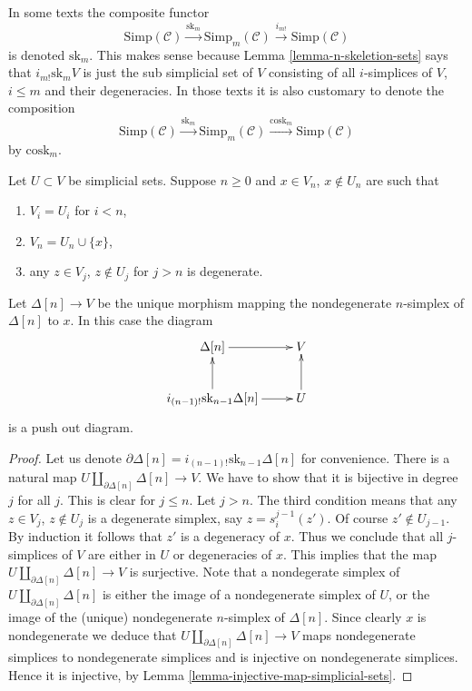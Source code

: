 \begin{remark}
\label{remark-sk-literature}
In some texts the composite functor
$$
\text{Simp}(\mathcal{C})
\xrightarrow{\text{sk}_m}
\text{Simp}_m(\mathcal{C})
\xrightarrow{i_{m!}}
\text{Simp}(\mathcal{C})
$$
is denoted $\text{sk}_m$. This makes sense because
Lemma \ref{lemma-n-skeletion-sets} says
that $i_{m!} \text{sk}_m V$ is just the sub simplicial set
of $V$ consisting of all $i$-simplices of $V$, $i \leq m$
and their degeneracies. In those texts it is also customary
to denote the composition
$$
\text{Simp}(\mathcal{C})
\xrightarrow{\text{sk}_m}
\text{Simp}_m(\mathcal{C})
\xrightarrow{\text{cosk}_m}
\text{Simp}(\mathcal{C})
$$
by $\text{cosk}_m$.
\end{remark}

\begin{lemma}
\label{lemma-glue-simlex}
Let $U \subset V$ be simplicial sets.
Suppose $n \geq 0$ and $x \in V_n$, $x \not \in U_n$ are such that
\begin{enumerate}
\item $V_i = U_i$ for $i < n$,
\item $V_n = U_n \cup \{x\}$,
\item any $z \in V_j$, $z \not \in U_j$ for $j > n$
is degenerate.
\end{enumerate}
Let $\Delta[n] \to V$ be the unique morphism mapping the
nondegenerate $n$-simplex of $\Delta[n]$ to $x$.
In this case the diagram
$$
\xymatrix{
\Delta[n] \ar[r] & V \\
i_{(n - 1)!} \text{sk}_{n - 1} \Delta[n] \ar[r] \ar[u] & U \ar[u]
}
$$
is a push out diagram.
\end{lemma}

\begin{proof}
Let us denote $\partial \Delta[n] = i_{(n - 1)!} \text{sk}_{n - 1} \Delta[n]$
for convenience. There is a natural map
$U \amalg_{\partial \Delta[n]} \Delta[n] \to V$.
We have to show that it is bijective in degree $j$
for all $j$. This is clear for $j \leq n$. Let $j > n$.
The third condition means that any $z \in V_j$, $z \not \in U_j$
is a degenerate simplex, say $z = s^{j - 1}_i(z')$. Of course
$z' \not \in U_{j - 1}$. By induction it follows that $z'$
is a degeneracy of $x$. Thus we conclude that all $j$-simplices
of $V$ are either in $U$ or degeneracies of $x$. This implies
that the map $U \amalg_{\partial \Delta[n]} \Delta[n] \to V$
is surjective. Note that a nondegerate simplex of
$U \amalg_{\partial \Delta[n]} \Delta[n]$ is either
the image of a nondegenerate simplex of $U$, or
the image of the (unique) nondegenerate $n$-simplex
of $\Delta[n]$. Since clearly $x$ is nondegenerate we
deduce that $U \amalg_{\partial \Delta[n]} \Delta[n] \to V$
maps nondegenerate simplices to nondegenerate simplices
and is injective on nondegenerate simplices. Hence it is
injective, by Lemma \ref{lemma-injective-map-simplicial-sets}.
\end{proof}

